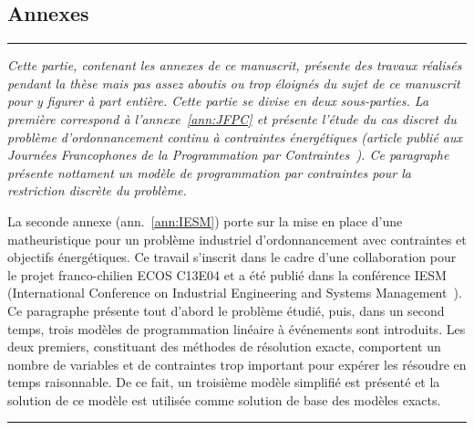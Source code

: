 \cleardoublepage
{}
\begin{center}
  \begin{minipage}{\textwidth}
  \part*{Annexes}
\end{minipage}
\end{center}

\newpage
\thispagestyle{empty}
\begin{center}
  \begin{minipage}{\textwidth}
    \hrule
    \vspace{0.5cm}
    {\it  Cette partie, contenant les annexes de ce manuscrit, présente des
      travaux réalisés pendant la thèse mais pas assez aboutis ou trop
      éloignés du sujet de ce manuscrit pour y figurer à part
      entière. Cette partie se divise en deux sous-parties. La
      première correspond à l'annexe~\ref{ann:JFPC} et
      présente l'étude du cas discret du problème d'ordonnancement
      continu à contraintes énergétiques (article publié aux
      Journées Francophones de la Programmation par
      Contraintes~\cite{Nattaf_JFPC}). Ce paragraphe présente
      nottament un modèle de programmation par contraintes pour la
      restriction discrète du problème.

      La seconde annexe (ann.~\ref{ann:IESM}) porte sur la mise en place d'une
      matheuristique pour un problème industriel d'ordonnancement avec
      contraintes et objectifs énergétiques. Ce travail s'inscrit dans
      le cadre d'une collaboration pour le projet franco-chilien ECOS C13E04 et a
      été publié dans la conférence IESM (International Conference on
      Industrial Engineering and Systems
      Management~\cite{Nattaf_IESM}). Ce paragraphe présente tout
      d'abord le problème étudié, puis, dans un second temps, trois
      modèles de programmation linéaire à événements sont introduits. Les deux
      premiers, constituant des méthodes de résolution exacte,
      comportent un nombre de variables et de contraintes trop
      important pour expérer les résoudre en temps raisonnable. De ce
      fait, un troisième modèle simplifié est présenté et la solution
      de ce modèle est utilisée comme solution de base des modèles
      exacts.}   
    \vspace{0.5cm}
    \hrule
  \end{minipage}
\end{center}


